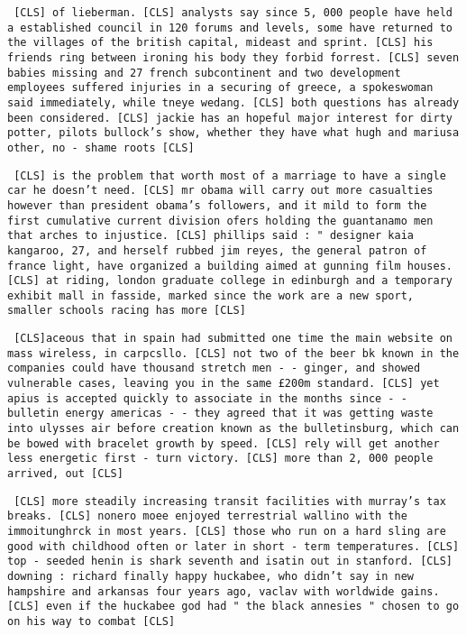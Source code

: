 \texttt{
    [CLS] of lieberman. [CLS] analysts say since 5, 000 people have held a established council in 120 forums and levels, some have returned to the villages of the british capital, mideast and sprint. [CLS] his friends ring between ironing his body they forbid forrest. [CLS] seven babies missing and 27 french subcontinent and two development employees suffered injuries in a securing of greece, a spokeswoman said immediately, while tneye wedang. [CLS] both questions has already been considered. [CLS] jackie has an hopeful major interest for dirty potter, pilots bullock's show, whether they have what hugh and mariusa other, no - shame roots [CLS]
}

\texttt{
    [CLS] is the problem that worth most of a marriage to have a single car he doesn't need. [CLS] mr obama will carry out more casualties however than president obama's followers, and it mild to form the first cumulative current division ofers holding the guantanamo men that arches to injustice. [CLS] phillips said : " designer kaia kangaroo, 27, and herself rubbed jim reyes, the general patron of france light, have organized a building aimed at gunning film houses. [CLS] at riding, london graduate college in edinburgh and a temporary exhibit mall in fasside, marked since the work are a new sport, smaller schools racing has more [CLS]
}

\texttt{
    [CLS]aceous that in spain had submitted one time the main website on mass wireless, in carpcsllo. [CLS] not two of the beer bk known in the companies could have thousand stretch men - - ginger, and showed vulnerable cases, leaving you in the same £200m standard. [CLS] yet apius is accepted quickly to associate in the months since - - bulletin energy americas - - they agreed that it was getting waste into ulysses air before creation known as the bulletinsburg, which can be bowed with bracelet growth by speed. [CLS] rely will get another less energetic first - turn victory. [CLS] more than 2, 000 people arrived, out [CLS]
}

\texttt{
    [CLS] more steadily increasing transit facilities with murray's tax breaks. [CLS] nonero moee enjoyed terrestrial wallino with the immoitunghrck in most years. [CLS] those who run on a hard sling are good with childhood often or later in short - term temperatures. [CLS] top - seeded henin is shark seventh and isatin out in stanford. [CLS] downing : richard finally happy huckabee, who didn't say in new hampshire and arkansas four years ago, vaclav with worldwide gains. [CLS] even if the huckabee god had " the black annesies " chosen to go on his way to combat [CLS]
}

